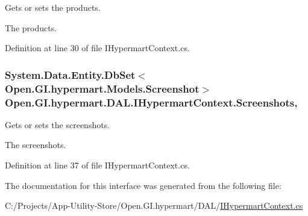 Gets or sets the products. 

The products. 

Definition at line 30 of file I\+Hypermart\+Context.\+cs.

\hypertarget{interface_open_1_1_g_i_1_1hypermart_1_1_d_a_l_1_1_i_hypermart_context_a2434b31b0324b19022883a71b1444494}{}
\subsubsection[{Screenshots}]{\setlength{\rightskip}{0pt plus 5cm}System.\+Data.\+Entity.\+Db\+Set$<${\bf Open.\+G\+I.\+hypermart.\+Models.\+Screenshot}$>$ Open.\+G\+I.\+hypermart.\+D\+A\+L.\+I\+Hypermart\+Context.\+Screenshots\hspace{0.3cm}{\ttfamily [get]}, {\ttfamily [set]}}\label{interface_open_1_1_g_i_1_1hypermart_1_1_d_a_l_1_1_i_hypermart_context_a2434b31b0324b19022883a71b1444494}


Gets or sets the screenshots. 

The screenshots. 

Definition at line 37 of file I\+Hypermart\+Context.\+cs.



The documentation for this interface was generated from the following file\+:\begin{DoxyCompactItemize}
\item 
C\+:/\+Projects/\+App-\/\+Utility-\/\+Store/\+Open.\+G\+I.\+hypermart/\+D\+A\+L/\hyperlink{_i_hypermart_context_8cs}{I\+Hypermart\+Context.\+cs}\end{DoxyCompactItemize}
